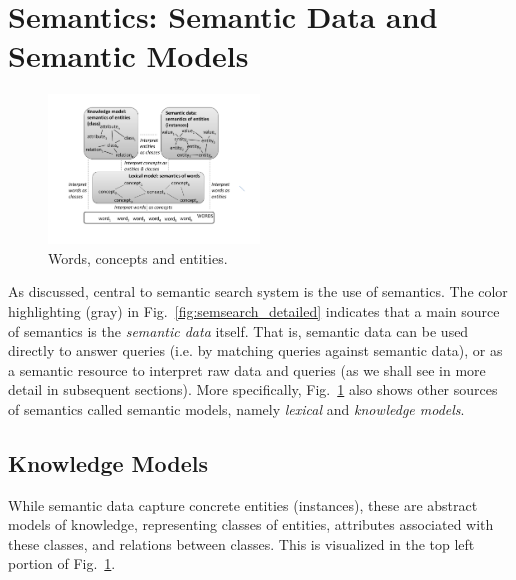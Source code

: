 \section{Semantics: Semantic Data and Semantic Models}\label{sec:semantics}
\begin{figure}[thb]
	\centering
		\includegraphics[width=0.5\textwidth]{figs/semantic_layer.pdf}
	\caption{Words, concepts and entities.}
	\label{fig:semantic_layer}
	\vspace{-0.5cm}
\end{figure}

As discussed, central to semantic search system is the use of semantics. The color highlighting (gray) in Fig.~\ref{fig:semsearch_detailed} indicates that a main source of semantics is the \emph{semantic data} itself. That is, semantic data can be used directly to answer queries (i.e. by matching queries against semantic data), or as a semantic resource to interpret raw data and queries (as we shall see in more detail in subsequent sections). More specifically, Fig.~\ref{fig:semantic_layer} also shows 
other sources of semantics called semantic models, namely \emph{lexical} and \emph{knowledge models}. 


\subsection{Knowledge Models} While semantic data capture concrete entities (instances), these are abstract models of knowledge, representing classes of entities, attributes associated with these classes, and relations between classes. This is visualized in the top left portion of Fig.~\ref{fig:semantic_layer}.  

